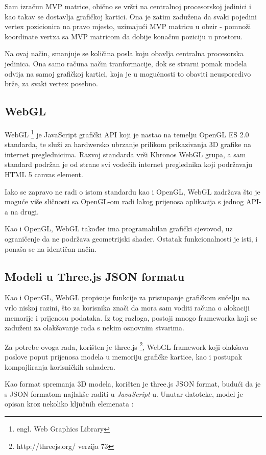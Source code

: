 Sam izračun MVP matrice, obično se vršri na centralnoj procesorskoj jedinici i kao takav se dostavlja grafičkoj kartici. Ona je zatim zadužena da svaki pojedini vertex pozicionira na pravo mjesto, uzimajući MVP matricu u obzir - pomnoži koordinate vertxa sa MVP matricom da dobije konačnu poziciju u prostoru.

Na ovaj način, smanjuje se količina posla koju obavlja centralna procesorska jedinica. Ona samo računa način tranformacije, dok se stvarni pomak modela odvija na samoj grafičkoj kartici, koja je u mogućnosti to obaviti neusporedivo brže, za svaki vertex posebno.

\subsection{WebGL}

WebGL \footnote{engl. Web Graphics Library} je JavaScript grafički API koji je nastao na temelju OpenGL ES 2.0 standarda, te služi za hardwersko ubrzanje prilikom prikazivanja 3D grafike na internet preglednicima. Razvoj standarda vrši Khronos WebGL grupa, a sam standard podržan je od strane svi vodećih internet preglednika koji podržavaju HTML 5 canvas element.

Iako se zapravo ne radi o istom standardu kao i OpenGL, WebGL zadržava što je moguće više sličnosti sa OpenGL-om radi lakog prijenosa aplikacija s jednog API-a na drugi.

Kao i OpenGL, WebGL također ima programabilan grafički cjevovod, uz ograničenje da ne podržava geometrijski shader. Ostatak funkcionalnosti je isti, i ponaša se na identičan način.

\subsection{Modeli u Three.js JSON formatu}

Kao i OpenGL, WebGL propisuje funkcije za pristupanje grafičkom sučelju na vrlo niskoj razini, što za korisnika znači da mora sam voditi računa o alokaciji memorije i prijenosu podataka. Iz tog razloga, postoji mnogo frameworka koji se zaduženi za olakšavanje rada s nekim osnovnim stvarima.

Za potrebe ovoga rada, korišten je three.js \footnote{http://threejs.org/ verzija 73}, WebGL framework koji olakšava poslove poput prijenosa modela u memoriju grafičke kartice, kao i postupak kompajliranja korisničkih sahadera.

Kao format spremanja 3D modela, korišten je three.js JSON format, budući da je s JSON formatom najlakše raditi u \emph{JavaScript}-u. Unutar datoteke, model je opisan kroz nekoliko ključnih elemenata \cite{threejs-json}:

